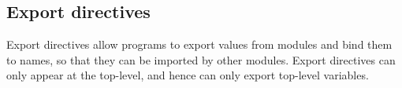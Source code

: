 \subsection*{Export directives}

Export directives allow programs to export values from modules and bind them to names, so that they can be imported by other modules.  Export directives can only appear at the top-level, and hence can only export top-level variables.
